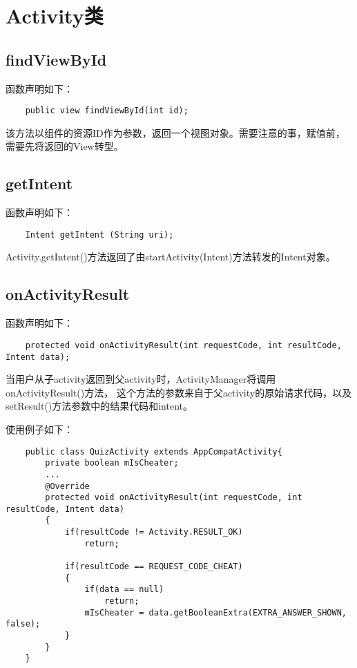 \documentclass[a4paper,left=2.5cm,right=2.5cm,11pt]{article}
\begin{document}


\section{Activity类}
\subsection{findViewById}
	函数声明如下：
	\begin{lstlisting}
	public view findViewById(int id);
	\end{lstlisting}

	该方法以组件的资源ID作为参数，返回一个视图对象。需要注意的事，赋值前，需要先将返回的View转型。

\subsection{getIntent}
	函数声明如下：
	\begin{lstlisting}
	Intent getIntent (String uri);
	\end{lstlisting}

	Activity.getIntent()方法返回了由startActivity(Intent)方法转发的Intent对象。

\subsection{onActivityResult}
	函数声明如下：
	\begin{lstlisting}
	protected void onActivityResult(int requestCode, int resultCode, Intent data);
	\end{lstlisting}

	当用户从子activity返回到父activity时，ActivityManager将调用onActivityResult()方法，
	这个方法的参数来自于父activity的原始请求代码，以及setResult()方法参数中的结果代码和intent。\par

	使用例子如下：
	\begin{lstlisting}
	public class QuizActivity extends AppCompatActivity{
		private boolean mIsCheater;
		...
		@Override
		protected void onActivityResult(int requestCode, int resultCode, Intent data)
		{
			if(resultCode != Activity.RESULT_OK)
				return;
			
			if(resultCode == REQUEST_CODE_CHEAT)
			{
				if(data == null)
					return;
				mIsCheater = data.getBooleanExtra(EXTRA_ANSWER_SHOWN, false);
			}
		}
	}
	\end{lstlisting}
\end{document}
